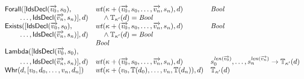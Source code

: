 \documentclass[fleqn,a4paper,dvips]{article}
\newcommand{\aterm}[1]{\mathsf{#1}}
\newcommand{\type}{\mathbb{T}}
\newcommand{\wt}{\nm{wt}}
\begin{document}
\begin{displaymath}
\begin{array}{lll}
\aterm{Forall}([\aterm{IdsDecl}(\vect{v_0},s_0),\
                                     &  \wt(\kappa+(\vect{v_0},s_0,\dots,\vect{v_n},s_n),d)       & \Bool\\
\t2\dots,\aterm{IdsDecl}(\vect{v_n},s_n)], d)
                                     & \t1\land\type_{\kappa'}(d)=\Bool                                     &\\
\aterm{Exists}([\aterm{IdsDecl}(\vect{v_0},s_0),
                                     & \wt(\kappa+(\vect{v_0},s_0,\dots,\vect{v_n},s_n),d)        & \Bool\\
\t2\dots,\aterm{IdsDecl}(\vect{v_n},s_n)], d)
                                     & \t1\land\type_{\kappa'}(d)=\Bool                                     &\\
                   & \Bool\\
\aterm{Lambda}([\aterm{IdsDecl}(\vect{v_0},s_0),\\
\t2\dots,\aterm{IdsDecl}(\vect{v_n},s_n)], d)
                                    & \wt(\kappa+(\vect{v_0},s_0,\dots,\vect{v_n},s_n),d)         & s_0^{\nm{len}(\vect{v_0})},\dots,s_n^{\nm{len}(\vect{v_n})}\to\type_{\kappa'}(d)\\
\aterm{Whr}(d,[v_0,d_0,\dots,v_n,d_n])& \wt(\kappa+(v_0,\type(d_0),\dots,v_n,\type(d_n)),d)       & \type_{\kappa'}(d)
\end{array}
\end{displaymath}
\end{document}
